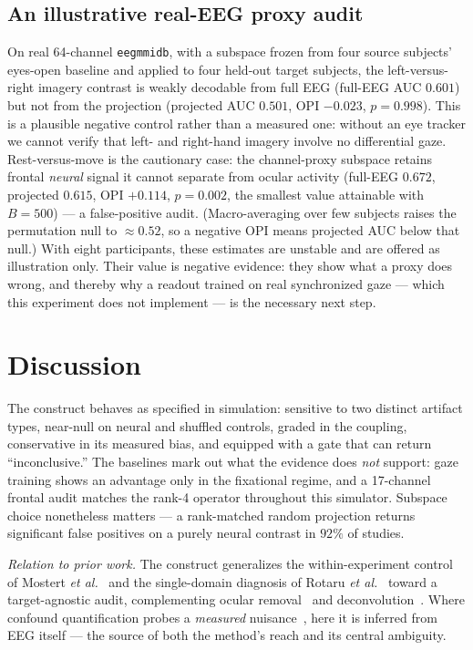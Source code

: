 \documentclass[conference]{IEEEtran}
\begin{document}
\subsection{An illustrative real-EEG proxy audit}

On real 64-channel \texttt{eegmmidb}, with a subspace frozen from four source subjects' eyes-open
baseline and applied to four held-out target subjects, the left-versus-right imagery contrast is
weakly decodable from full EEG (full-EEG AUC $0.601$) but not from the projection (projected AUC
$0.501$, OPI $-0.023$, $p=0.998$). This is a plausible negative control rather than a measured
one: without an eye tracker we cannot verify that left- and right-hand imagery involve no
differential gaze. Rest-versus-move is the cautionary case: the channel-proxy subspace retains
frontal \emph{neural} signal it cannot separate from ocular activity (full-EEG $0.672$, projected
$0.615$, OPI $+0.114$, $p=0.002$, the smallest value attainable with $B{=}500$) --- a false-positive audit. (Macro-averaging over few
subjects raises the permutation null to $\approx0.52$, so a negative OPI means projected AUC
below that null.) With eight participants, these estimates are unstable and are offered as
illustration only. Their value is negative evidence: they show what a proxy does wrong,
and thereby why a readout trained on real synchronized gaze --- which this experiment does not
implement --- is the necessary next step.

\section{Discussion}\label{sec:discussion}

The construct behaves as specified in simulation: sensitive to two distinct artifact types,
near-null on neural and shuffled controls, graded in the coupling, conservative in its measured
bias, and equipped with a gate that can return ``inconclusive.'' The baselines mark out what the
evidence does \emph{not} support: gaze training shows an advantage only in the fixational regime, and
a 17-channel frontal audit matches the rank-4 operator throughout this simulator. Subspace choice
nonetheless matters --- a rank-matched random projection returns significant false positives on a
purely neural contrast in $92\%$ of studies.

\emph{Relation to prior work.} The construct generalizes the within-experiment control of
Mostert \emph{et al.}~\cite{mostert2018eye} and the single-domain diagnosis of Rotaru
\emph{et al.}~\cite{rotaru2024decoding} toward a target-agnostic audit, complementing ocular
removal~\cite{jung2000removing,dimigen2020optimizing} and
deconvolution~\cite{ehinger2019unfold}. Where confound quantification probes a \emph{measured}
nuisance~\cite{chaibubneto2018permutations}, here it is inferred from EEG itself --- the source of
both the method's reach and its central ambiguity.
\end{document}
